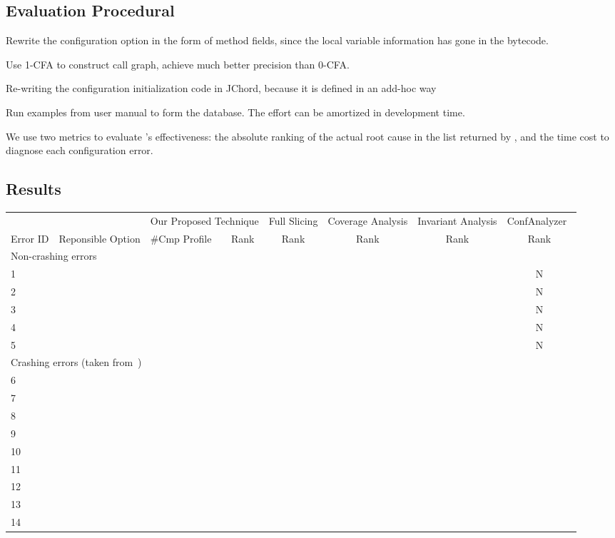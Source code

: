 \subsection{Evaluation Procedural}


Rewrite the configuration option in the form of method fields, since
the local variable information has gone in the bytecode.

Use 1-CFA to construct call graph, achieve much better precision
than 0-CFA. 

Re-writing the configuration initialization code in JChord, because
it is defined in an add-hoc way

Run examples from user manual to form the database. The effort
can be amortized in development time.

We use two metrics to evaluate \ourtool's effectiveness: the absolute ranking of the
actual root cause in the list returned by \ourtool, and the
time cost to diagnose each configuration error.


\subsection{Results}

\begin{table*}[t]
\setlength{\tabcolsep}{.54\tabcolsep}
\begin{tabular}{|l||l||l|l||c||c||c||c|}
\hline
  & & \multicolumn{2}{|c||}{Our Proposed Technique} & Full Slicing & Coverage Analysis& Invariant Analysis & ConfAnalyzer~\cite{}\\
\cline{3-8}
 Error ID & Reponsible Option & \#Cmp Profile & Rank  & Rank & Rank & Rank & Rank \\
 \hline
\hline
\multicolumn{8}{|l|}{Non-crashing errors}   \\
 \hline
 1 & & & & & & &N \\
 2 & & & & & & &N\\
 3 & & & & & & &N\\
 4 & & & & & & &N\\
 5 & & & & & & &N\\
\hline
\hline
\multicolumn{8}{|l|}{Crashing errors (taken from~\cite{})}   \\
\hline
 6 & & & & & & &\\
 7 & & & & & & &\\
 8 & & & & & & &\\
 9 & & & & & & &\\
 10 & & & & & & &\\
 11 & & & & & & &\\
 12 & & & & & & &\\
 13 & & & & & & &\\
 14 & & & & & & &\\
\hline
\end{tabular}

\end{table*}


